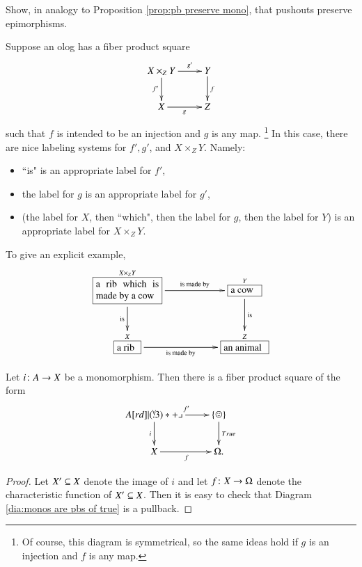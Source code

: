 \begin{exercise}
Show, in analogy to Proposition \ref{prop:pb preserve mono}, that pushouts preserve epimorphisms.
\end{exercise}

\begin{example}\label{exc:olog pullbacks}

Suppose an olog has a fiber product square
$$\xymatrix{X\times_ZY\ar[r]^-{g'}\ar[d]_{f'}&Y\ar[d]^f\\X\ar[r]_g&Z}$$ such that $f$ is intended to be an injection and $g$ is any map.
\footnote{Of course, this diagram is symmetrical, so the same ideas hold if $g$ is an injection and $f$ is any map.} 
In this case, there are nice labeling systems for $f', g'$, and $X\times_ZY$. Namely:
\begin{itemize}
\item ``is" is an appropriate label for $f'$, 
\item the label for $g$ is an appropriate label for $g'$,
\item (the label for $X$, then ``which", then the label for $g$, then the label for $Y$) is an appropriate label for $X\times_ZY$.
\end{itemize}

To give an explicit example, 
$$\xymatrix{
\obox{X\times_ZY}{.9in}{a rib which is made by a cow}\LA{rr}{is made by}\LAL{d}{is}&&\obox{Y}{.4in}{a cow}\LA{d}{is}\\
\obox{X}{.3in}{a rib}\LAL{rr}{is made by}&&\obox{Z}{.6in}{an animal}
}
$$

\end{example}

\begin{corollary}\label{cor:monos are pullbacks of true}

Let $i\taking A\to X$ be a monomorphism. Then there is a fiber product square of the form 
\begin{align}\label{dia:monos are pbs of true}
\xymatrix{A\ar[r]^{f'}\ar[d]_i\ullimit&\singleton\ar[d]^{True}\\X\ar[r]_f&\Omega.}
\end{align}

\end{corollary}

\begin{proof}

Let $X'\ss X$ denote the image of $i$ and let $f\taking X\to\Omega$ denote the characteristic function of $X'\ss X$. Then it is easy to check that Diagram \ref{dia:monos are pbs of true} is a pullback.

\end{proof}

